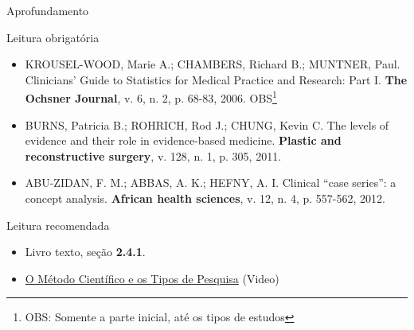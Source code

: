 \documentclass{beamer}
\begin{document}
\begin{frame}{Aprofundamento}
  \begin{block}{Leitura obrigatória}
    \begin{itemize}
      \tiny
    \item KROUSEL-WOOD, Marie A.; CHAMBERS, Richard B.; MUNTNER, Paul. Clinicians' Guide to Statistics for Medical Practice and Research: Part I. {\bf The Ochsner Journal}, v. 6, n. 2, p. 68-83, 2006. \alert{OBS}\footnote{OBS: Somente a parte inicial, até os tipos de estudos}
    \item BURNS, Patricia B.; ROHRICH, Rod J.; CHUNG, Kevin C. The levels of evidence and their role in evidence-based medicine. {\bf Plastic and reconstructive surgery}, v. 128, n. 1, p. 305, 2011.
    \item ABU-ZIDAN, F. M.; ABBAS, A. K.; HEFNY, A. I. Clinical “case series”: a concept analysis. {\bf African health sciences}, v. 12, n. 4, p. 557-562, 2012.
    \end{itemize}
  \end{block}
  \begin{block}{Leitura recomendada}
    \footnotesize
    \begin{itemize}
    \item Livro texto, seção {\bf 2.4.1}.
    \item \href{https://youtu.be/ey9bTshV308}{O Método Científico e os Tipos de Pesquisa} (Video)
    \end{itemize}
  \end{block}
\end{frame}







\end{document}
